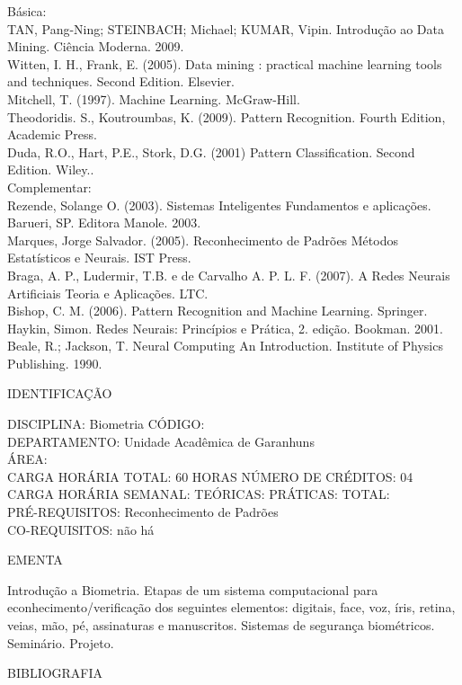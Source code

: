 \documentclass[
	12pt,				%
	openright,			%
  oneside,     %
	a4paper,			%
	chapter=TITLE,		%
	english,			%
	french,				%
	spanish,			%
	brazil				%
	]{abntex2}
\begin{document}
\begin{apendicesenv}
Básica:\\
TAN, Pang-Ning; STEINBACH; Michael; KUMAR, Vipin. Introdução ao Data
Mining. Ciência Moderna. 2009.\\
Witten, I. H., Frank, E. (2005). Data mining : practical machine
learning tools and techniques. Second Edition. Elsevier.\\
Mitchell, T. (1997). Machine Learning. McGraw-Hill.\\
Theodoridis. S., Koutroumbas, K. (2009). Pattern Recognition. Fourth
Edition, Academic Press.\\
Duda, R.O., Hart, P.E., Stork, D.G. (2001) Pattern Classification.
Second Edition. Wiley..\\
Complementar:\\
Rezende, Solange O. (2003). Sistemas Inteligentes  Fundamentos e
aplicações. Barueri, SP. Editora Manole. 2003.\\
Marques, Jorge Salvador. (2005). Reconhecimento de Padrões  Métodos
Estatísticos e Neurais. IST Press.\\
Braga, A. P., Ludermir, T.B. e de Carvalho A. P. L. F. (2007). A Redes
Neurais Artificiais  Teoria e Aplicações. LTC.\\
Bishop, C. M. (2006). Pattern Recognition and Machine Learning.
Springer.\\
Haykin, Simon. Redes Neurais: Princípios e Prática, 2. edição. Bookman.
2001.\\
Beale, R.; Jackson, T. Neural Computing  An Introduction. Institute of Physics Publishing. 1990.

\newpage IDENTIFICAÇÃO

DISCIPLINA: Biometria CÓDIGO:\\ 
DEPARTAMENTO: Unidade Acadêmica de Garanhuns\\
ÁREA: \\
CARGA HORÁRIA TOTAL: 60 HORAS NÚMERO DE CRÉDITOS: 04\\
CARGA HORÁRIA SEMANAL: TEÓRICAS: PRÁTICAS: TOTAL: \\
PRÉ-REQUISITOS: Reconhecimento de Padrões\\
CO-REQUISITOS: não há

EMENTA 

Introdução a Biometria. Etapas de um sistema computacional para
econhecimento/verificação dos seguintes elementos: digitais, face, voz, íris, retina, veias, mão, pé, assinaturas e manuscritos. Sistemas de segurança biométricos. Seminário. Projeto.

BIBLIOGRAFIA 


\end{apendicesenv}
\end{document}
